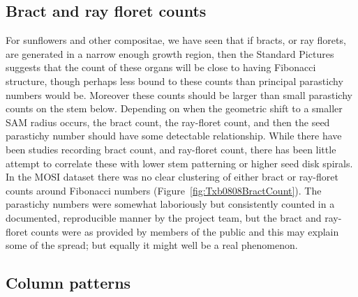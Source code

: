  \subsection{Bract and ray floret counts}
 For sunflowers and other compositae, we have seen that if bracts, or ray florets, are generated in a narrow enough growth region, then the Standard Pictures suggests that the count of these organs will be close to having Fibonacci structure,  though perhaps less bound to these counts than principal parastichy numbers would be. Moreover these counts should be larger than small parastichy counts on the stem below. Depending on when the geometric shift to a smaller SAM radius occurs, the bract count, the ray-floret count, and then the seed parastichy number should have some detectable relationship. While there have been studies recording bract count, and ray-floret count, there has been little attempt to correlate these with lower stem patterning or higher seed disk spirals.
 In the MOSI dataset there was no clear clustering of either bract or ray-floret counts around Fibonacci numbers (Figure~\ref{fig:Txb0808BractCount}). The parastichy numbers were somewhat laboriously but consistently counted in a documented, reproducible manner by the project team, but the bract and ray-floret counts were as provided by members of the public and this may explain some of the spread; but equally it might well be a real phenomenon. 
  
 
 
     \subsection{Column patterns}
  
